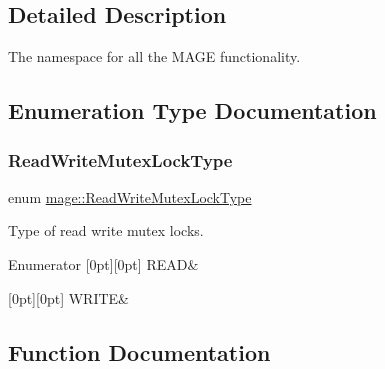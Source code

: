 \subsection{Detailed Description}
The namespace for all the M\+A\+GE functionality. 

\subsection{Enumeration Type Documentation}
\hypertarget{namespacemage_afd76fcca37ce5c5b2227671290973c74}{}\label{namespacemage_afd76fcca37ce5c5b2227671290973c74} 
\subsubsection{\texorpdfstring{Read\+Write\+Mutex\+Lock\+Type}{ReadWriteMutexLockType}}
{\footnotesize\ttfamily enum \hyperlink{namespacemage_afd76fcca37ce5c5b2227671290973c74}{mage\+::\+Read\+Write\+Mutex\+Lock\+Type}}

Type of read write mutex locks. \begin{DoxyEnumFields}{Enumerator}
[0pt][0pt]{}\hypertarget{namespacemage_afd76fcca37ce5c5b2227671290973c74a384918b13691984406aeb754f1c454d0}{}\label{namespacemage_afd76fcca37ce5c5b2227671290973c74a384918b13691984406aeb754f1c454d0} 
R\+E\+AD&\\
\hline

[0pt][0pt]{}\hypertarget{namespacemage_afd76fcca37ce5c5b2227671290973c74aff9d196f4bda4079f3f1ce90bd644662}{}\label{namespacemage_afd76fcca37ce5c5b2227671290973c74aff9d196f4bda4079f3f1ce90bd644662} 
W\+R\+I\+TE&\\
\hline

\end{DoxyEnumFields}


\subsection{Function Documentation}
\hypertarget{namespacemage_a7d706913bb9fb322c938cd3e4d8eaede}{}\label{namespacemage_a7d706913bb9fb322c938cd3e4d8eaede} 
